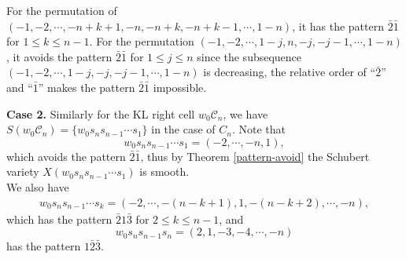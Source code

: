 \documentclass[11pt, reqno]{amsart}
\theoremstyle{definition}
\numberwithin{equation}{section}
\begin{document}
For the permutation of $(-1,-2,\cdots,-n+k+1,-n,-n+k,-n+k-1,\cdots,1-n)$, it has the pattern $\bar{2}\bar{1}$ for $1\leq k \leq n-1$. For the permutation $(-1,-2,\cdots,1-j,n,-j,-j-1,\cdots,1-n)$, it avoids the pattern $\bar{2}\bar{1}$ for $1\leq j\leq n$ since the subsequence $(-1,-2,\cdots,1-j,-j,-j-1,\cdots,1-n)$ is decreasing, the relative order of “$\bar{2}$” and “$\bar{1}$” makes the pattern $\bar{2}\bar{1}$ impossible. 

{\bf Case 2.} Similarly for the KL right cell $w_0\mathcal{C}_n$, we have $S(w_0\mathcal{C}_n)=\{w_0s_ns_{n-1}\cdots s_1\}$ in the case of $C_n$. Note that 
$$w_0s_ns_{n-1}\cdots s_1=(-2,\cdots,-n,1),$$
which avoids the pattern $\bar{2}\bar{1}$, thus by Theorem \ref{pattern-avoid}  the Schubert variety $X(w_0s_ns_{n-1}\cdots s_1)$ is smooth.  \\
We also have
\begin{align*}
w_0s_ns_{n-1}\cdots s_k=(-2,\cdots,-(n-k+1),1,-(n-k+2),\cdots,-n),
\end{align*}
which has the pattern $\bar{2}1\bar{3}$ for $2\leq k\leq n-1$, and  
$$w_0s_ns_{n-1}s_n=(2,1,-3,-4,\cdots,-n)$$
has the pattern $1\bar{2}\bar{3}$.
\end{document}
